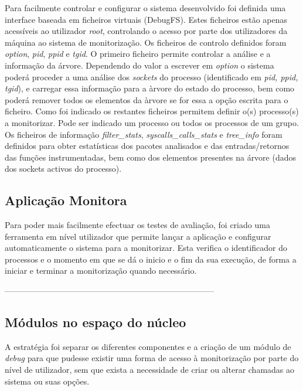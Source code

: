 Para facilmente controlar e configurar o sistema desenvolvido foi definida uma interface baseada em ficheiros virtuais (DebugFS). Estes ficheiros estão apenas acessíveis ao utilizador \textit{root}, controlando o acesso por parte dos utilizadores da máquina ao sistema de monitorização. Os ficheiros de controlo definidos foram \textit{option}, \textit{pid}, \textit{ppid} e \textit{tgid}. O primeiro ficheiro permite controlar a análise e a informação da árvore. Dependendo do valor a escrever em \textit{option} o sistema poderá proceder a uma análise dos \textit{sockets} do processo (identificado em \textit{pid, ppid, tgid}), e carregar essa informação para a àrvore do estado do processo, bem como poderá remover todos os elementos da àrvore se for essa a opção escrita para o ficheiro. Como foi indicado os restantes ficheiros permitem definir o(s) processo(s) a monitorizar. Pode ser indicado um processo ou todos os processos de um grupo. Os ficheiros de informação \textit{filter\_stats},  \textit{syscalls\_calls\_stats} e \textit{tree\_info} foram definidos para obter estatísticas dos pacotes analisados e das entradas/retornos das funções instrumentadas, bem como dos elementos presentes na árvore (dados dos sockets activos do processo).


\subsection{Aplicação Monitora}
\label{sub:monitor_app}

Para poder mais facilmente efectuar os testes de avaliação, foi criado uma ferramenta em nível utilizador que permite lançar a aplicação e configurar automaticamente o sistema para a monitorizar. Esta verifica o identificador do processos e o momento em que se dá o inicio e o fim da sua execução, de forma a iniciar e terminar a monitorização quando necessário.



-----------------------------------------------------------------------------



\subsection{Módulos no espaço do núcleo}
A estratégia foi separar os diferentes componentes e a criação de um módulo de \textit{debug} para que pudesse existir uma forma de acesso à monitorização por parte do nível de utilizador, sem que exista a necessidade de criar ou alterar chamadas ao sistema ou suas opções.

